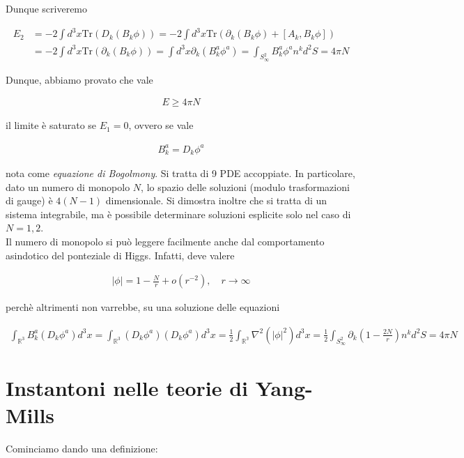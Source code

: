\documentclass{report}
\begin{document}
Dunque scriveremo 

\begin{align}
    E_2 &= -2\int d^3x \text{Tr}(D_k (B_k\phi)) = -2\int d^3x \text{Tr}(\partial_k (B_k\phi)+ [A_k, B_k\phi]) \\
    &= -2\int d^3x \text{Tr}(\partial_k (B_k\phi)) = \int d^3x \partial_k (B^a_k\phi^a) = \int_{S^2_\infty} B^a_k\phi^a n^k d^2S = 4\pi N
\end{align}


Dunque, abbiamo provato che vale 

\begin{align}
    E \geq 4\pi N
\end{align}

il limite è saturato se \(E_1 = 0\), ovvero se vale 

\begin{align}
    B^a_k = D_k \phi^a
\end{align}

nota come \emph{equazione di Bogolmony}. Si tratta di 9 PDE accoppiate. In particolare, dato un numero di monopolo \(N\), lo spazio delle soluzioni (modulo trasformazioni di gauge) è \(4(N-1)\) dimensionale. Si dimostra inoltre che si tratta di un sistema integrabile, ma è possibile determinare soluzioni esplicite solo nel caso di \(N=1, 2\). \\

Il numero di monopolo si può leggere facilmente anche dal comportamento asindotico del ponteziale di Higgs. Infatti, deve valere 

\begin{align}
    |\phi| = 1 - \frac{N}{r} + o(r^{-2}), \quad r \rightarrow \infty
\end{align}


perchè altrimenti non varrebbe, su una soluzione delle equazioni

\begin{align}
    \int_{\mathbb{R}^3} B^a_k(D_k\phi^a)d^3x = \int_{\mathbb{R}^3} (D_k\phi^a)(D_k\phi^a)d^3x = \frac{1}{2}\int_{\mathbb{R^3}}\nabla^2(|\phi|^2)d^3x = \frac{1}{2}\int_{S^2_\infty} \partial_k\left(1 - \frac{2N}{r}\right)n^k d^2S = 4\pi N 
\end{align}

\section{Instantoni nelle teorie di Yang-Mills}

Cominciamo dando una definizione: 
\end{document}
